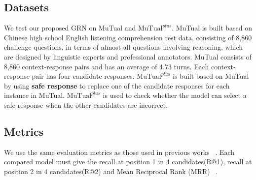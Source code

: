 \documentclass[letterpaper]{article}
\begin{document}
\subsection{Datasets}
We test our proposed GRN on MuTual and $\text{MuTual}^{plus}$. MuTual is built based on Chinese high school English listening comprehension test data, consisting of 8,860 challenge questions, in terms of almost all questions involving reasoning, which are designed by linguistic experts and professional annotators. MuTual consists of 8,860 context-response pairs and has an average of 4.73 turns. Each context-response pair has four candidate responses. $\text{MuTual}^{plus}$ is built based on MuTual by using \textbf{safe response}  to replace one of the candidate responses for each instance in MuTual. $\text{MuTual}^{plus}$ is used to check whether the model can select a safe response when the other candidates are incorrect.

\subsection{Metrics}
We use the same evaluation metrics as those used in previous works ~\cite{mutual2020}. Each compared model must give the recall at position 1 in 4 candidates(R@1), recall at position 2 in 4 candidates(R@2) and Mean Reciprocal Rank (MRR) ~\cite{Ricardo2016}.
\end{document}
